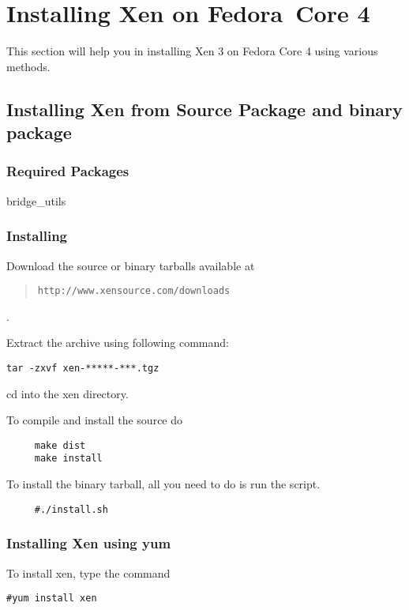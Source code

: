\chapter{Installing Xen on Fedora~Core 4}

This section will help you in installing Xen 3 on Fedora Core 4 using various methods.

\section{Installing Xen from Source Package and binary package}

\subsection{Required Packages}
bridge\_utils


\subsection{Installing}

Download the source or binary tarballs available at \begin{quote} {\tt http://www.xensource.com/downloads } \end{quote}.

Extract the archive using following command:

\begin{verbatim}
tar -zxvf xen-*****-***.tgz
\end{verbatim}

cd into the xen directory.

To compile and install the source do

\begin{verbatim}
     make dist
     make install
\end{verbatim}


To install the binary tarball, all you need to do is run the  script.

\begin{verbatim}
     #./install.sh
\end{verbatim}

\subsection{Installing Xen using yum}

To install xen, type the command

\begin{verbatim}
#yum install xen
\end{verbatim}

